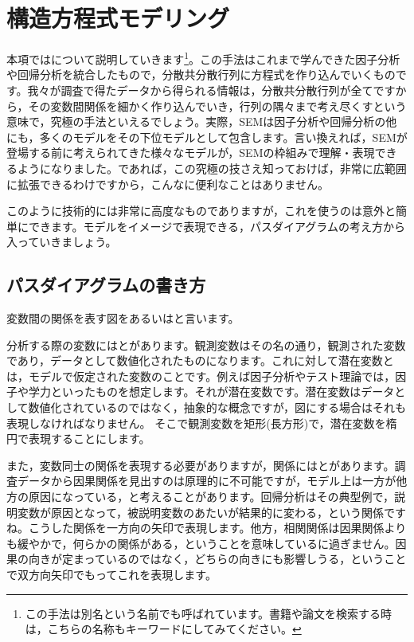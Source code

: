 \documentclass{ltjsbook}
\begin{document}
 
\chapter{構造方程式モデリング}
\label{chapter12} 

本項ではについて説明していきます\footnote{この手法は別名という名前でも呼ばれています。書籍や論文を検索する時は，こちらの名称もキーワードにしてみてください。}。この手法はこれまで学んできた因子分析や回帰分析を統合したもので，分散共分散行列に方程式を作り込んでいくものです。我々が調査で得たデータから得られる情報は，分散共分散行列が全てですから，その変数間関係を細かく作り込んでいき，行列の隅々まで考え尽くすという意味で，究極の手法といえるでしょう。実際，SEMは因子分析や回帰分析の他にも，多くのモデルをその下位モデルとして包含します。言い換えれば，SEMが登場する前に考えられてきた様々なモデルが，SEMの枠組みで理解・表現できるようになりました。であれば，この究極の技さえ知っておけば，非常に広範囲に拡張できるわけですから，こんなに便利なことはありません。

このように技術的には非常に高度なものでありますが，これを使うのは意外と簡単にできます。モデルをイメージで表現できる，パスダイアグラムの考え方から入っていきましょう。

\section{パスダイアグラムの書き方} 
変数間の関係を表す図をあるいはと言います。

分析する際の変数にはとがあります。観測変数はその名の通り，観測された変数であり，データとして数値化されたものになります。これに対して潜在変数とは，モデルで仮定された変数のことです。例えば因子分析やテスト理論では，因子や学力といったものを想定します。それが潜在変数です。潜在変数はデータとして数値化されているのではなく，抽象的な概念ですが，図にする場合はそれも表現しなければなりません。
そこで観測変数を矩形(長方形)で，潜在変数を楕円で表現することにします。

また，変数同士の関係を表現する必要がありますが，関係にはとがあります。調査データから因果関係を見出すのは原理的に不可能ですが，モデル上は一方が他方の原因になっている，と考えることがあります。回帰分析はその典型例で，説明変数が原因となって，被説明変数のあたいが結果的に変わる，という関係ですね。こうした関係を一方向の矢印で表現します。他方，相関関係は因果関係よりも緩やかで，何らかの関係がある，ということを意味しているに過ぎません。因果の向きが定まっているのではなく，どちらの向きにも影響しうる，ということで双方向矢印でもってこれを表現します。
\end{document}
